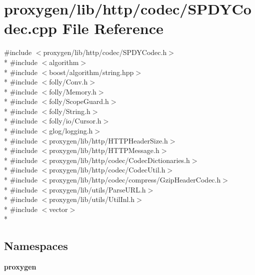 \section{proxygen/lib/http/codec/\+S\+P\+D\+Y\+Codec.cpp File Reference}
\label{SPDYCodec_8cpp}
{\ttfamily \#include $<$proxygen/lib/http/codec/\+S\+P\+D\+Y\+Codec.\+h$>$}\\*
{\ttfamily \#include $<$algorithm$>$}\\*
{\ttfamily \#include $<$boost/algorithm/string.\+hpp$>$}\\*
{\ttfamily \#include $<$folly/\+Conv.\+h$>$}\\*
{\ttfamily \#include $<$folly/\+Memory.\+h$>$}\\*
{\ttfamily \#include $<$folly/\+Scope\+Guard.\+h$>$}\\*
{\ttfamily \#include $<$folly/\+String.\+h$>$}\\*
{\ttfamily \#include $<$folly/io/\+Cursor.\+h$>$}\\*
{\ttfamily \#include $<$glog/logging.\+h$>$}\\*
{\ttfamily \#include $<$proxygen/lib/http/\+H\+T\+T\+P\+Header\+Size.\+h$>$}\\*
{\ttfamily \#include $<$proxygen/lib/http/\+H\+T\+T\+P\+Message.\+h$>$}\\*
{\ttfamily \#include $<$proxygen/lib/http/codec/\+Codec\+Dictionaries.\+h$>$}\\*
{\ttfamily \#include $<$proxygen/lib/http/codec/\+Codec\+Util.\+h$>$}\\*
{\ttfamily \#include $<$proxygen/lib/http/codec/compress/\+Gzip\+Header\+Codec.\+h$>$}\\*
{\ttfamily \#include $<$proxygen/lib/utils/\+Parse\+U\+R\+L.\+h$>$}\\*
{\ttfamily \#include $<$proxygen/lib/utils/\+Util\+Inl.\+h$>$}\\*
{\ttfamily \#include $<$vector$>$}\\*
\subsection*{Namespaces}
\begin{DoxyCompactItemize}
\item 
 {\bf proxygen}
\end{DoxyCompactItemize}
